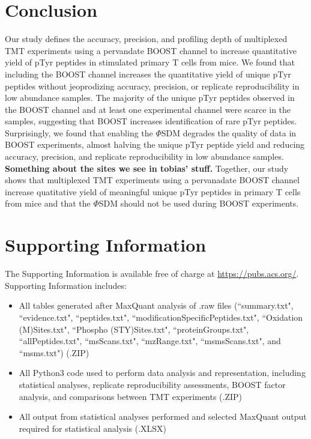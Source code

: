 \documentclass[journal=jprobs,manuscript=article]{achemso}
\begin{document}
\section{Conclusion}

Our study defines the accuracy, precision, and profiling depth of multiplexed TMT experiments using a pervandate BOOST channel to increase quantitative yield of pTyr peptides in stimulated primary T cells from mice. We found that including the BOOST channel increases the quantitative yield of unique pTyr peptides without jeoprodizing accuracy, precision, or replicate reproducibility in low abundance samples. The majority of the unique pTyr peptides observed in the BOOST channel and at least one experimental channel were scarce in the samples, suggesting that BOOST increases identification of rare pTyr peptides. Surprisingly, we found that enabling the $\Phi$SDM degrades the quality of data in BOOST experiments, almost halving the unique pTyr peptide yield and reducing accuracy, precision, and replicate reproducibility in low abundance samples. \textbf{ Something about the sites we see in tobias' stuff.} Together, our study shows that multiplexed TMT experiments using a pervanadate BOOST channel increase quatitative yield of meaningful unique pTyr peptides in primary T cells from mice and that the $\Phi$SDM should not be used during BOOST experiments.

\section{Supporting Information}

The Supporting Information is available free of charge at \href{https://pubs.acs.org/}{https://pubs.acs.org/}. Supporting Information includes:

\begin{itemize}
    \item {All tables generated after MaxQuant analysis of .raw files (``summary.txt", ``evidence.txt", ``peptides.txt", ``modificationSpecificPeptides.txt", ``Oxidation (M)Sites.txt", ``Phospho (STY)Sites.txt", ``proteinGroups.txt", ``allPeptides.txt", ``msScans.txt", ``mzRange.txt", ``msmsScans.txt",  and ``msms.txt") (.ZIP)}
    \item {All Python3 code used to perform data analysis and representation, including statistical analyses, replicate reproducibility assessments, BOOST factor analysis, and comparisons between TMT experiments (.ZIP)}
    \item {All output from statistical analyses performed and selected MaxQuant output required for statistical analysis (.XLSX)}
\end{itemize}
\end{document}
